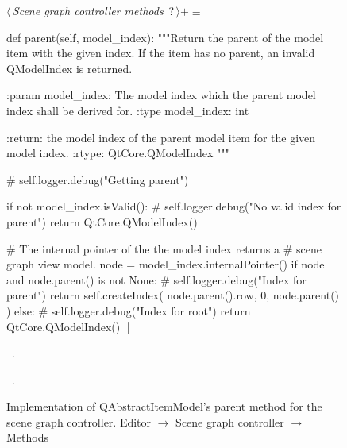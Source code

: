 \documentclass[%
    a4paper,    %
    justified,  %
    nobib,      %
    openany     %
]{tufte-book}
\begin{document}
\begin{figure}
\begin{flushleft} \small
\begin{minipage}{\linewidth}\label{scrap32}\raggedright\small
{} $\langle\,${\itshape Scene graph controller methods}\nobreak\ {\footnotesize {?}}$\,\rangle+\equiv$
\vspace{-1ex}
\begin{pythoncode}
def parent(self, model_index):
    """Return the parent of the model item with the given index.
    If the item has no parent, an invalid QModelIndex is returned.

    :param model_index: The model index which the parent model
                        index shall be derived for.
    :type model_index:  int

    :return: the model index of the parent model item for the
             given model index.
    :rtype:  QtCore.QModelIndex
    """

    # self.logger.debug("Getting parent")

    if not model_index.isValid():
        # self.logger.debug("No valid index for parent")
        return QtCore.QModelIndex()

    # The internal pointer of the the model index returns a
    # scene graph view model.
    node = model_index.internalPointer()
    if node and node.parent() is not None:
        # self.logger.debug("Index for parent")
        return self.createIndex(
            node.parent().row, 0, node.parent()
        )
    else:
        # self.logger.debug("Index for root")
        return QtCore.QModelIndex()
|\NWsep|
\end{pythoncode}
\vspace{1.5ex}
\footnotesize
\begin{list}{}{\setlength{\itemsep}{-\parsep}\setlength{\itemindent}{-\leftmargin}}
\item \NWtxtMacroDefBy\ .
\item \NWtxtMacroRefIn\ .

\item{}
\end{list}
\end{minipage}\vspace{4ex}
\end{flushleft}
\caption{Implementation of QAbstractItemModel's parent method for the scene graph
  controller.
  \newline{}\newline{}Editor $\rightarrow$ Scene graph controller $\rightarrow$
  Methods}
\label{editor:lst:scene-graph-controller:methods:parent}
\end{figure}
\end{document}
